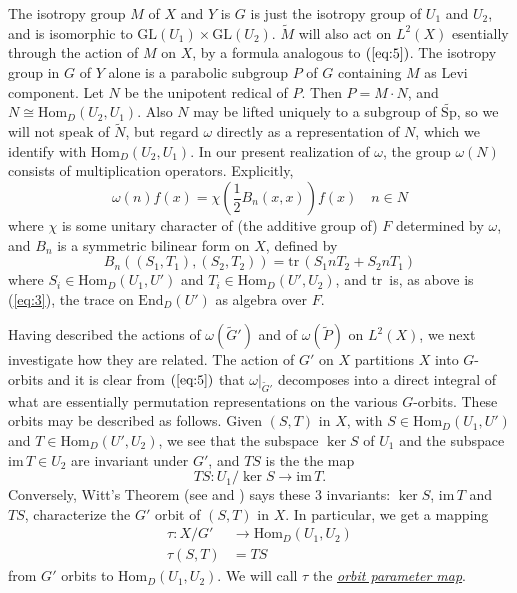 \documentclass[12pt]{amsart}
\def\emp#1{\underline{\em #1}}
\def\tSp{{\widetilde{\mathrm{Sp}}}}
\def\GL{{\mathrm{GL}}}
\def\Hom{{\mathrm{Hom}}}
\def\End{{\mathrm{End}}}
\def\im{{\mathrm{im\,}}}
\def\tP{{\widetilde{P}}}
\def\tM{{\widetilde{M}}}
\def\tG{{\widetilde{G}}}
\def\tr{{\mathrm{tr\,}}}
\begin{document}
The isotropy group $M$ of $X$ and $Y$ is $G$ is just the isotropy group
of $U_1$ and $U_2$, and is isomorphic to $\GL(U_1)\times\GL(U_2)$.
$\tM$ will also act on $L^2(X)$ esentially through the action of $M$ on $X$, 
by a formula analogous to $(\ref{eq:5})$. 
The isotropy group in $G$ of $Y$ alone is a parabolic subgroup $P$ of $G$ 
containing $M$ as Levi component. Let $N$ be the unipotent redical of $P$. 
Then $P=M\cdot N$, and $N\cong \Hom_D(U_2,U_1)$. 
Also $N$ may be lifted uniquely to a subgroup of $\tSp$, so 
we will not speak of $\widetilde{N}$, but regard $\omega$ directly 
as a representation of $N$, which we identify with 
$\Hom_D(U_2,U_1)$. In our present realization of $\omega$, the group 
$\omega(N)$ consists of multiplication operators. 
Explicitly, 
\begin{equation}\label{eq:7}
\omega(n)f(x) = \chi(\frac{1}{2}B_n(x,x))f(x)\quad n\in N
\end{equation}
where $\chi$ is some unitary character of (the additive group of) $F$
determined by $\omega$, and $B_n$ is a symmetric bilinear form on $X$, 
defined by 
\begin{equation}\label{eq:8}
B_n((S_1,T_1),(S_2,T_2)) = \tr(S_1n T_2 + S_2n T_1) 
\end{equation}
where $S_i\in \Hom_D(U_1,U')$ and $T_i\in \Hom_D(U',U_2)$, and 
$\tr$ is, as above is (\ref{eq:3}), the trace on $\End_D(U')$
as algebra over $F$.

Having described the actions of $\omega(\tG')$ and of $\omega(\tP)$
on $L^2(X)$, we next investigate how they are related. 
The action of $G'$ on $X$ partitions $X$ into $G$-orbits and 
it is clear from $(\ref{eq:5})$ that $\omega|_{\tG'}$ decomposes into
a direct integral of what are essentially permutation 
representations on the various $G$-orbits. 
These orbits may be described as follows. 
Given $(S,T)$ in $X$, with $S\in \Hom_D(U_1,U')$ and 
$T\in \Hom_D(U',U_2)$, we see that the subspace $\ker S$ of
$U_1$ and the subspace $\im T\in U_2$ are invariant under $G'$, 
and $TS$ is the the map 
\[
TS: U_1/\ker S \to \im T.
\]
Conversely, Witt's Theorem (see \cite{Jacobson1953} and \cite{HoweOsc1})
says these $3$ invariants:
$\ker S$, $\im T$ and $TS$, characterize the $G'$ orbit of $(S,T)$ in $X$. 
In particular, we get a mapping 
\begin{equation}\label{eq:9}
\begin{split}
\tau:X/G' &\to \Hom_D(U_1,U_2)\\
\tau(S,T) &= TS
\end{split}
\end{equation}
from $G'$ orbits to $\Hom_D(U_1,U_2)$. We will call $\tau$ the 
\emp{orbit parameter map}.
\end{document}
